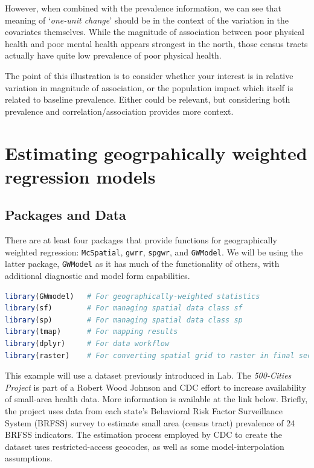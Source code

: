 \documentclass[
]{book}
\newcommand{\passthrough}[1]{#1}
\begin{document}
However, when combined with the prevalence information, we can see that meaning of `\emph{one-unit change}' should be in the context of the variation in the covariates themselves. While the magnitude of association between poor physical health and poor mental health appears strongest in the north, those census tracts actually have quite low prevalence of poor physical health.

The point of this illustration is to consider whether your interest is in relative variation in magnitude of association, or the population impact which itself is related to baseline prevalence. Either could be relevant, but considering both prevalence and correlation/association provides more context.

\hypertarget{estimating-geogrpahically-weighted-regression-models}{%
\section{Estimating geogrpahically weighted regression models}\label{estimating-geogrpahically-weighted-regression-models}}

\hypertarget{packages-and-data}{%
\subsection{Packages and Data}\label{packages-and-data}}

There are at least four packages that provide functions for geographically weighted regression: \passthrough{\lstinline!McSpatial!}, \passthrough{\lstinline!gwrr!}, \passthrough{\lstinline!spgwr!}, and \passthrough{\lstinline!GWModel!}. We will be using the latter package, \passthrough{\lstinline!GWModel!} as it has much of the functionality of others, with additional diagnostic and model form capabilities.

\begin{lstlisting}[language=R]
library(GWmodel)   # For geographically-weighted statistics
library(sf)        # For managing spatial data class sf
library(sp)        # For managing spatial data class sp
library(tmap)      # For mapping results
library(dplyr)     # For data workflow
library(raster)    # For converting spatial grid to raster in final section
\end{lstlisting}

This example will use a dataset previously introduced in Lab. The \emph{500-Cities Project} is part of a Robert Wood Johnson and CDC effort to increase availability of small-area health data. More information is available at the link below. Briefly, the project uses data from each state's Behavioral Risk Factor Surveillance System (BRFSS) survey to estimate small area (census tract) prevalence of 24 BRFSS indicators. The estimation process employed by CDC to create the dataset uses restricted-access geocodes, as well as some model-interpolation assumptions.
\end{document}
